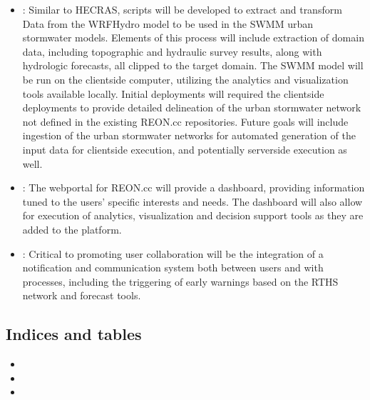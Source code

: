 \documentclass[letterpaper,12pt,english]{book}
\begin{document}
\begin{itemize}
\item {} 
\sphinxAtStartPar
{}: Similar to HEC\sphinxhyphen{}RAS, scripts will be developed to extract and transform
Data from the WRF\sphinxhyphen{}Hydro model to be used in the SWMM urban stormwater
models. Elements of this process will include extraction of domain data,
including topographic and hydraulic survey results, along with hydrologic
forecasts, all clipped to the target domain. The SWMM model will be run on
the client\sphinxhyphen{}side computer, utilizing the analytics and visualization tools
available locally. Initial deployments will required the client\sphinxhyphen{}side
deployments to provide detailed delineation of the urban stormwater network
not defined in the existing REON.cc repositories. Future goals will include
ingestion of the urban stormwater networks for automated generation of the
input data for client\sphinxhyphen{}side execution, and potentially server\sphinxhyphen{}side execution
as well.

\end{itemize}
\begin{itemize}
\item {} 
\sphinxAtStartPar
{}: The web\sphinxhyphen{}portal for REON.cc will provide a dashboard,
providing information tuned to the users’ specific interests and needs. The
dashboard will also allow for execution of analytics, visualization and
decision support tools as they are added to the platform.

\item {} 
\sphinxAtStartPar
{}: Critical to promoting user collaboration will be the
integration of a notification and communication system both between users
and with processes, including the triggering of early warnings based on the
RTHS network and forecast tools.

\end{itemize}


\subsection{Indices and tables}
\label{\detokenize{requirements/index:indices-and-tables}}\begin{itemize}
\item {} 
\sphinxAtStartPar
{}

\item {} 
\sphinxAtStartPar
{}

\item {} 
\sphinxAtStartPar
{}

\end{itemize}
\end{document}
